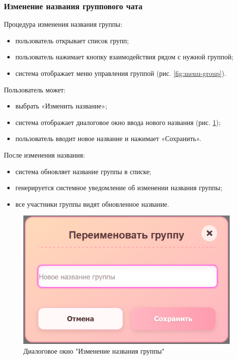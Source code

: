 \subsubsection{Изменение названия группового чата}  
Процедура изменения названия группы:
\begin{itemize}
	\item пользователь открывает список групп;
	\item пользователь нажимает кнопку взаимодействия рядом с нужной группой;
	\item система отображает меню управления группой (рис. \ref{fig:menu-group}).
\end{itemize}

Пользователь может:
\begin{itemize}
	\item выбрать «Изменить название»;
	\item система отображает диалоговое окно ввода нового названия (рис. \ref{fig:group-rename});
	\item пользователь вводит новое название и нажимает «Сохранить».
\end{itemize}

После изменения названия:
\begin{itemize}
	\item система обновляет название группы в списке;
	\item генерируется системное уведомление об изменении названия группы;
	\item все участники группы видят обновленное название.
\end{itemize}

\begin{figure}[h]
	\centering
	\includegraphics[width=0.8\linewidth]{"images/Окно переименования группы"}
	\caption{Диалоговое окно "Изменение названия группы"}
	\label{fig:group-rename}
\end{figure}

